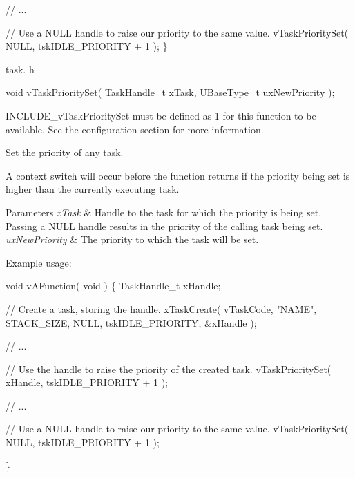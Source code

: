 \begin{DoxyPre}  // ...\end{DoxyPre}



\begin{DoxyPre}  // Use a NULL handle to raise our priority to the same value.
  vTaskPrioritySet( NULL, tskIDLE\_PRIORITY + 1 );
\}
\end{DoxyPre}


task. h 
\begin{DoxyPre}void \hyperlink{externals_2freertos_2include_2task_8h_a1ee31be76e326e0644dbd6ac40a787b6}{vTaskPrioritySet( TaskHandle\_t xTask, UBaseType\_t uxNewPriority )};\end{DoxyPre}


I\+N\+C\+L\+U\+D\+E\+\_\+v\+Task\+Priority\+Set must be defined as 1 for this function to be available. See the configuration section for more information.

Set the priority of any task.

A context switch will occur before the function returns if the priority being set is higher than the currently executing task.


\begin{DoxyParams}{Parameters}
{\em x\+Task} & Handle to the task for which the priority is being set. Passing a N\+U\+LL handle results in the priority of the calling task being set.\\
\hline
{\em ux\+New\+Priority} & The priority to which the task will be set.\\
\hline
\end{DoxyParams}
Example usage\+: 
\begin{DoxyPre}
void vAFunction( void )
\{
TaskHandle\_t xHandle;
\begin{DoxyVerb}// Create a task, storing the handle.
xTaskCreate( vTaskCode, "NAME", STACK_SIZE, NULL, tskIDLE_PRIORITY, &xHandle );

// ...

// Use the handle to raise the priority of the created task.
vTaskPrioritySet( xHandle, tskIDLE_PRIORITY + 1 );

// ...

// Use a NULL handle to raise our priority to the same value.
vTaskPrioritySet( NULL, tskIDLE_PRIORITY + 1 );
\end{DoxyVerb}

\}
  \end{DoxyPre}
 